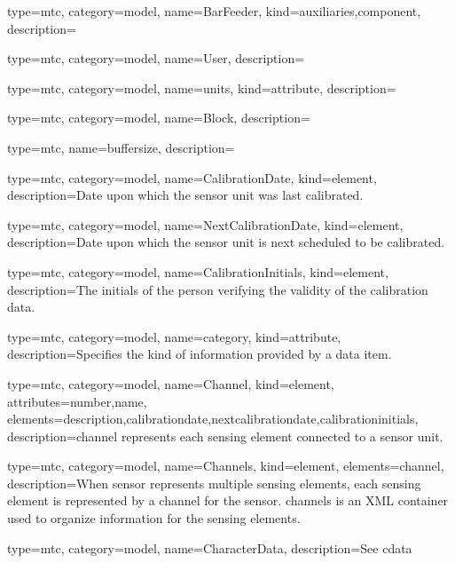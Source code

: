 {
  type=mtc,
  category=model,
  name={BarFeeder},
  kind={auxiliaries,component},
  description={}
}


{
  type=mtc,
  category=model,
  name={User},
  description={}
}


{
  type=mtc,
  category=model,
  name={units},
  kind={attribute},
  description={}
}


{
  type=mtc,
  category=model,
  name={Block},
  description={}
}


{
  type=mtc,
  name=buffersize,
  description={}
}


{
  type=mtc,
  category=model,
  name={CalibrationDate},
  kind={element},
  description={Date upon which the \gls{sensor unit} was last calibrated. }
}


{
  type=mtc,
  category=model,
  name={NextCalibrationDate},
  kind={element},
  description={Date upon which the sensor unit is next scheduled to be calibrated. }
}


{
  type=mtc,
  category=model,
  name={CalibrationInitials},
  kind={element},
  description={The initials of the person verifying the validity of the calibration data.}
}


{
  type=mtc,
  category=model,
  name={category},
  kind={attribute},
  description={Specifies the kind of information provided by a data item. }
}


{
  type=mtc,
  category=model,
  name={Channel},
  kind={element},
  attributes={\gls{number},\gls{name}},
  elements={\gls{description},\gls{calibrationdate},\gls{nextcalibrationdate},\gls{calibrationinitials}},
  description={\gls{channel} represents each \gls{sensing element} connected to a \gls{sensor unit}.}
}

{
  type=mtc,
  category=model,
  name={Channels},
  kind={element},
  elements={\gls{channel}},
  description={When \gls{sensor} represents multiple \glspl{sensing element}, each \gls{sensing element} is represented by a \gls{channel} for the \gls{sensor}. \gls{channels} is an XML container used to organize information for the \glspl{sensing element}. }
}


{
  type=mtc,
  category=model,
  name={CharacterData},
  description={See \gls{cdata}}
}


